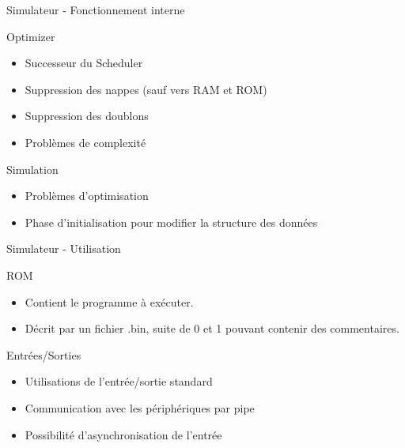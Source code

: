 \documentclass{beamer}
\begin{document}
\begin{frame}{Simulateur - Fonctionnement interne}
  
  \begin{block}{Optimizer}
    \begin{itemize}
    \item Successeur du Scheduler
    \item Suppression des nappes (sauf vers RAM et ROM)
    \item Suppression des doublons
    \item Problèmes de complexité
    \end{itemize}
  \end{block}
  
  \pause
  
  \begin{block}{Simulation}
    \begin{itemize}
    \item Problèmes d'optimisation
    \item Phase d'initialisation pour modifier la structure des données
    \end{itemize}
  \end{block}
  
\end{frame}

\begin{frame}{Simulateur - Utilisation}

  \begin{block}{ROM}
    \begin{itemize}
    \item Contient le programme à exécuter.
    \item Décrit par un fichier .bin, suite de 0 et 1 pouvant contenir des commentaires.
    \end{itemize}
  \end{block}
	
  \pause
	
  \begin{block}{Entrées/Sorties}
    \begin{itemize}
    \item Utilisations de l'entrée/sortie standard
    \item Communication avec les périphériques par pipe
    \item Possibilité d'asynchronisation de l'entrée
    \end{itemize}
  \end{block}

\end{frame}
\end{document}
